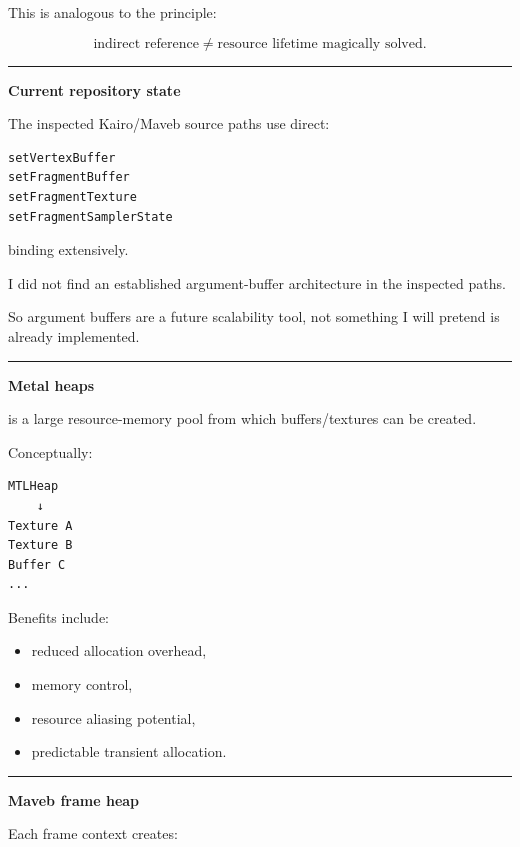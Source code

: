 This is analogous to the principle:

\[
\boxed{
\text{indirect reference}
\neq
\text{resource lifetime magically solved}.
}
\]

\begin{center}\rule{0.5\linewidth}{0.5pt}\end{center}

\textbf{Current repository state}

The inspected Kairo/Maveb source paths use direct:

\begin{verbatim}
setVertexBuffer
setFragmentBuffer
setFragmentTexture
setFragmentSamplerState
\end{verbatim}

binding extensively.

I did not find an established argument-buffer architecture in the inspected paths.

So argument buffers are a future scalability tool, not something I will pretend is already implemented.

\begin{center}\rule{0.5\linewidth}{0.5pt}\end{center}

\textbf{Metal heaps}

 is a large resource-memory pool from which buffers/textures can be created.

Conceptually:

\begin{verbatim}
MTLHeap
    ↓
Texture A
Texture B
Buffer C
...
\end{verbatim}

Benefits include:

\begin{itemize}
\tightlist
\item
  reduced allocation overhead,
\item
  memory control,
\item
  resource aliasing potential,
\item
  predictable transient allocation.
\end{itemize}

\begin{center}\rule{0.5\linewidth}{0.5pt}\end{center}

\textbf{Maveb frame heap}

Each frame context creates:

